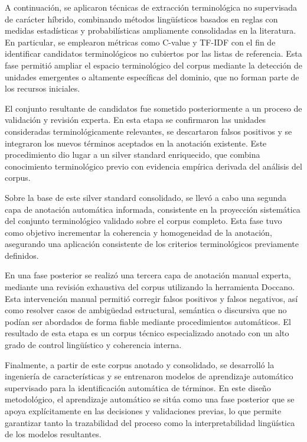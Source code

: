 A continuación, se aplicaron técnicas de extracción terminológica no supervisada de carácter híbrido, combinando métodos lingüísticos basados en reglas con medidas estadísticas y probabilísticas ampliamente consolidadas en la literatura. En particular, se emplearon métricas como C-value y TF-IDF con el fin de identificar candidatos terminológicos no cubiertos por las listas de referencia. Esta fase permitió ampliar el espacio terminológico del corpus mediante la detección de unidades emergentes o altamente específicas del dominio, que no forman parte de los recursos iniciales.

El conjunto resultante de candidatos fue sometido posteriormente a un proceso de validación y revisión experta. En esta etapa se confirmaron las unidades consideradas terminológicamente relevantes, se descartaron falsos positivos y se integraron los nuevos términos aceptados en la anotación existente. Este procedimiento dio lugar a un silver standard enriquecido, que combina conocimiento terminológico previo con evidencia empírica derivada del análisis del corpus.

Sobre la base de este silver standard consolidado, se llevó a cabo una segunda capa de anotación automática informada, consistente en la proyección sistemática del conjunto terminológico validado sobre el corpus completo. Esta fase tuvo como objetivo incrementar la coherencia y homogeneidad de la anotación, asegurando una aplicación consistente de los criterios terminológicos previamente definidos.

En una fase posterior se realizó una tercera capa de anotación manual experta, mediante una revisión exhaustiva del corpus utilizando la herramienta Doccano. Esta intervención manual permitió corregir falsos positivos y falsos negativos, así como resolver casos de ambigüedad estructural, semántica o discursiva que no podían ser abordados de forma fiable mediante procedimientos automáticos. El resultado de esta etapa es un corpus técnico especializado anotado con un alto grado de control lingüístico y coherencia interna.

Finalmente, a partir de este corpus anotado y consolidado, se desarrolló la ingeniería de características y se entrenaron modelos de aprendizaje automático supervisado para la identificación automática de términos. En este diseño metodológico, el aprendizaje automático se sitúa como una fase posterior que se apoya explícitamente en las decisiones y validaciones previas, lo que permite garantizar tanto la trazabilidad del proceso como la interpretabilidad lingüística de los modelos resultantes.


